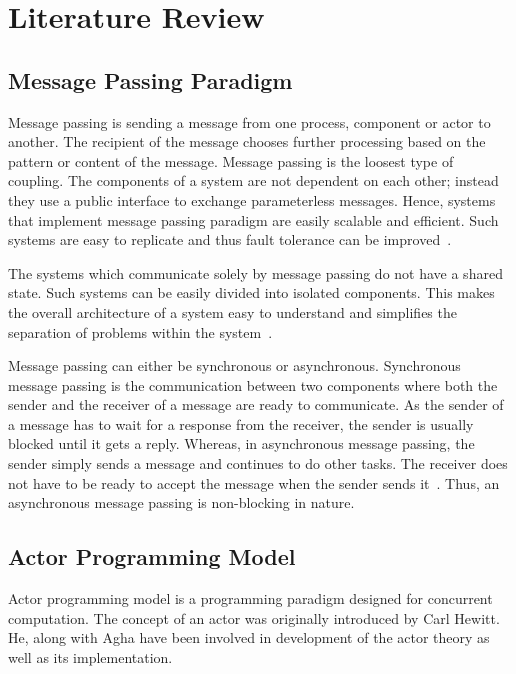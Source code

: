 \chapter{Literature Review}\label{chapter:literature_review}

\section{Message Passing Paradigm}
\label{sec:messagePassing}
  Message passing is sending a message from one process, component or actor to another. The recipient of the message chooses further processing based on the pattern or content of the message.
  Message passing is the loosest type of coupling. The components of a system are not dependent on each other; instead they use a public interface to exchange parameterless messages\cite{joecelko}. Hence, systems that implement message passing paradigm are easily scalable and efficient. Such systems are easy to replicate and thus fault tolerance can be improved~\cite{Armstrong:2010:ERL:1810891.1810910}.

  The systems which communicate solely by message passing do not have a shared state. Such systems can be easily divided into isolated components. This makes the overall architecture of a system easy to understand and simplifies the separation of problems within the system~\cite{Armstrong:2010:ERL:1810891.1810910}.

  Message passing can either be synchronous or asynchronous. Synchronous message passing is the communication between two components where both the sender and the receiver of a message are ready to communicate. As the sender of a message has to wait for a response from the receiver, the sender is usually blocked until it gets a reply. Whereas, in asynchronous message passing, the sender simply sends a message and continues to do other tasks. The receiver does not have to be ready to accept the message when the sender sends it~\cite{agha}. Thus, an asynchronous message passing is non-blocking in nature.

\section{Actor Programming Model}
\label{sec:actorProgramming}
  Actor programming model is a programming paradigm designed for concurrent computation. The concept of an actor was originally introduced by Carl Hewitt\cite{hewitt}. He, along with Agha\cite{agha} have been involved in development of the actor theory as well as its implementation.

